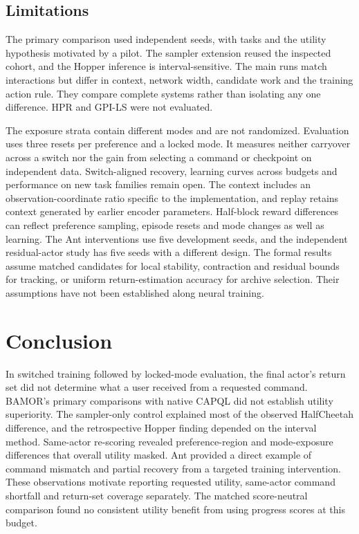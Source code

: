 \documentclass[10pt]{article}
\begin{document}
\subsection{Limitations}
The primary comparison used independent seeds, with tasks and the utility
hypothesis motivated by a pilot. The sampler extension reused the inspected
cohort, and the Hopper inference is interval-sensitive. The main runs match
interactions but differ in context, network width, candidate work and the
training action rule. They compare complete systems rather than isolating
any one difference. HPR and GPI-LS were not evaluated.

The exposure strata contain different modes and are not randomized.
Evaluation uses three resets per preference and a locked mode. It measures
neither carryover across a switch nor the gain from selecting a command or
checkpoint on independent data. Switch-aligned recovery, learning curves
across budgets and performance on new task families remain open.
The context includes an observation-coordinate
ratio specific to the implementation, and replay retains context generated
by earlier encoder parameters. Half-block reward differences can reflect
preference sampling, episode resets and mode changes as well as learning.
The Ant interventions use five development seeds, and the independent
residual-actor study has five seeds with a different design. The formal results
assume matched candidates for local stability, contraction and residual bounds
for tracking, or uniform return-estimation accuracy for archive selection.
Their assumptions have not been established along neural training.

\section{Conclusion}
In switched training followed by locked-mode evaluation, the final actor's
return set did not determine what a user received from a requested command.
BAMOR's primary comparisons with native CAPQL did not establish utility
superiority. The sampler-only control explained most of the observed
HalfCheetah difference, and the retrospective Hopper finding depended on
the interval method. Same-actor re-scoring revealed preference-region and
mode-exposure differences that overall utility masked. Ant provided a
direct example of command mismatch and partial recovery from a targeted
training intervention. These observations motivate reporting requested
utility, same-actor command shortfall and return-set coverage separately.
The matched score-neutral comparison found no consistent utility benefit
from using progress scores at this budget.
\end{document}
